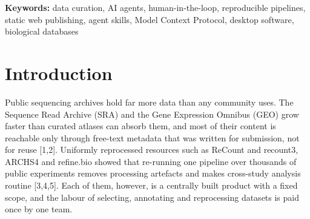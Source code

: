 \documentclass[11pt,a4paper]{article}
\begin{document}
\begin{abstract}
network failures are retried a bounded number of times and everything
else is escalated to the user with the log and a resume point; outputs
are checksummed, manifested and archived locally. One project agent and
four specialists, each with its own model, instructions and fixed tool
list, work in a single conversation per project; they act only through
the same validated commands as the interface, run only when addressed,
and every call, including every MCP call, is recorded. Any
OpenAI-compatible, Anthropic or Gemini endpoint, including locally
served models, can be the model. We present DBA as a design
contribution: its two workflows and architecture, the skill and MCP
mechanisms and their boundaries, the safeguards around acting agents,
two collection walkthroughs on live services, one of which carries a single
GPSAdb-style dataset from a GEO search through a help request to a
checksummed count matrix, an Agent-authored PBMC5k website case with
5,025 cells, and a feature comparison with
repository-scale curation agents, dataset fetchers, screening tools,
workflow platforms and static publishing tools. Usability and the
quality of the repositories users build with it remain to be evaluated.
Software availability is described in the Data and code availability section.
\end{abstract}

{\small
\textbf{Keywords:} data curation, AI agents, human-in-the-loop,
reproducible pipelines, static web publishing, agent skills, Model
Context Protocol, desktop software, biological databases


}

\section{Introduction}\label{introduction}

Public sequencing archives hold far more data than any community uses.
The Sequence Read Archive (SRA) and the Gene Expression Omnibus (GEO)
grow faster than curated atlases can absorb them, and most of their
content is reachable only through free-text metadata that was written
for submission, not for reuse {[}1,2{]}. Uniformly reprocessed resources
such as ReCount and recount3, ARCHS4 and refine.bio showed that
re-running one pipeline over thousands of public experiments removes
processing artefacts and makes cross-study analysis routine {[}3,4,5{]}.
Each of them, however, is a centrally built product with a fixed scope,
and the labour of selecting, annotating and reprocessing datasets is
paid once by one team.
\end{document}
